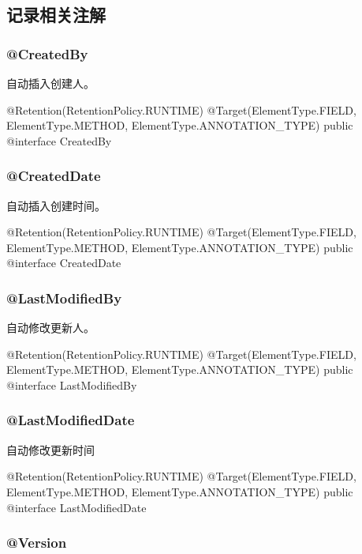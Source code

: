 \subsection{记录相关注解}

\subsubsection{@CreatedBy}

自动插入创建人。

\begin{Java}
@Retention(RetentionPolicy.RUNTIME)
@Target({ElementType.FIELD, ElementType.METHOD, ElementType.ANNOTATION_TYPE})
public @interface CreatedBy {
}
\end{Java}

\subsubsection{@CreatedDate}

自动插入创建时间。

\begin{Java}
@Retention(RetentionPolicy.RUNTIME)
@Target({ElementType.FIELD, ElementType.METHOD, ElementType.ANNOTATION_TYPE})
public @interface CreatedDate {
}
\end{Java}

\subsubsection{@LastModifiedBy}

自动修改更新人。

\begin{Java}
@Retention(RetentionPolicy.RUNTIME)
@Target({ElementType.FIELD, ElementType.METHOD, ElementType.ANNOTATION_TYPE})
public @interface LastModifiedBy {
}
\end{Java}

\subsubsection{@LastModifiedDate}

自动修改更新时间

\begin{Java}
@Retention(RetentionPolicy.RUNTIME)
@Target({ElementType.FIELD, ElementType.METHOD, ElementType.ANNOTATION_TYPE})
public @interface LastModifiedDate {
}
\end{Java}

\subsubsection{@Version}

